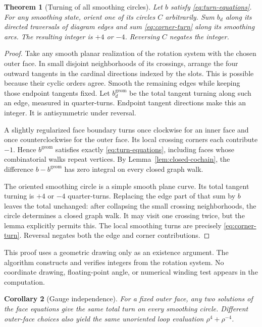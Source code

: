 \documentclass[11pt]{article}
\newtheorem{theorem}{Theorem}[section]
\newtheorem{corollary}[theorem]{Corollary}
\theoremstyle{definition}
\theoremstyle{remark}
\begin{document}
\begin{theorem}[Turning of all smoothing circles]
\label{thm:turning}
Let $b$ satisfy \eqref{eq:turn-equations}. For any smoothing state, orient
one of its circles $C$ arbitrarily. Sum $b_d$ along its directed traversals
of diagram edges and sum \eqref{eq:corner-turn} along its smoothing arcs.
The resulting integer is $+4$ or $-4$. Reversing $C$ negates the integer.
\end{theorem}

\begin{proof}
Take any smooth planar realization of the rotation system with the chosen
outer face. In small disjoint neighborhoods of its crossings, arrange
the four outward tangents in the cardinal directions indexed by the
slots. This is possible because their cyclic orders agree. Smooth the
remaining edges while keeping those endpoint tangents fixed.
Let $b^{\mathrm{geom}}_d$ be the total tangent turning along such an edge,
measured in quarter-turns. Endpoint tangent directions make this an integer.
It is antisymmetric under reversal.

A slightly regularized face boundary turns once clockwise for an inner
face and once counterclockwise for the outer face. Its local crossing
corners each contribute $-1$. Hence $b^{\mathrm{geom}}$ satisfies exactly
\eqref{eq:turn-equations}, including faces whose combinatorial walks
repeat vertices. By Lemma~\ref{lem:closed-cochain}, the difference
$b-b^{\mathrm{geom}}$ has zero integral on every closed graph walk.

The oriented smoothing circle is a simple smooth plane curve. Its total
tangent turning is $+4$ or $-4$ quarter-turns. Replacing the edge part of
that sum by $b$ leaves the total unchanged: after collapsing the small
crossing neighborhoods, the circle determines a closed graph walk.
It may visit one crossing twice, but the lemma explicitly permits this.
The local smoothing turns are precisely \eqref{eq:corner-turn}.
Reversal negates both the edge and corner contributions.
\end{proof}

This proof uses a geometric drawing only as an existence argument. The
algorithm constructs and verifies integers from the rotation system.
No coordinate drawing, floating-point angle, or numerical winding test
appears in the computation.

\begin{corollary}[Gauge independence]
\label{cor:gauge}
For a fixed outer face, any two solutions of the face equations give the
same total turn on every smoothing circle. Different outer-face choices
also yield the same unoriented loop evaluation $\rho^4+\rho^{-4}$.
\end{corollary}
\end{document}
